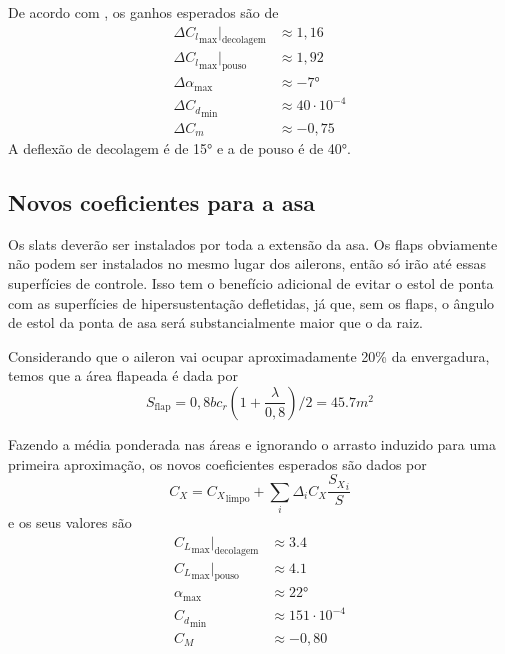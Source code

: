 De acordo com \cite{gudmundsson}, os ganhos esperados são de
\begin{align*}
    \Delta {C_l}_{\max}|_{\text{decolagem}} &\approx 1,16 \\
    \Delta {C_l}_{\max}|_{\text{pouso}} &\approx 1,92 \\
    \Delta {\alpha}_{\max} &\approx \ang{-7} \\
    \Delta {C_d}_{\min} &\approx 40\cdot 10^{-4} \\
    \Delta {C_m} &\approx -0,75
\end{align*}
A deflexão de decolagem é de \ang{15} e a de pouso é de \ang{40}.

\subsection{Novos coeficientes para a asa}
Os slats deverão ser instalados por toda a extensão da asa.
Os flaps obviamente não podem ser instalados no mesmo lugar dos ailerons, então só irão até essas
superfícies de controle.
Isso tem o benefício adicional de evitar o estol de ponta com as superfícies de hipersustentação defletidas, já que, sem os flaps, o ângulo de estol da ponta de asa será substancialmente maior que o da raiz.

Considerando que o aileron vai ocupar aproximadamente 20\% da envergadura, temos
que a área flapeada é dada por
\begin{equation}
    S_{\text{flap}} = 0,8 b c_r (1+\frac{\lambda}{0,8})/2 = 45.7\si{m^2}
\end{equation}

Fazendo a média ponderada nas áreas e ignorando o arrasto induzido para uma
primeira aproximação, os novos coeficientes esperados são dados por
\begin{equation}
    C_X = {C_X}_{\text{limpo}} + \sum_i{\Delta_i C_X \frac{{S_X}_i}{S}}
\end{equation}
e os seus valores são
\begin{align*}
    {C_L}_{\max}|_{\text{decolagem}} &\approx 3.4 \\
    {C_L}_{\max}|_{\text{pouso}} &\approx 4.1\\
    {\alpha}_{\max} &\approx \ang{22} \\
    {C_d}_{\min} &\approx 151\cdot 10^{-4} \\
    {C_M} &\approx -0,80
\end{align*}
